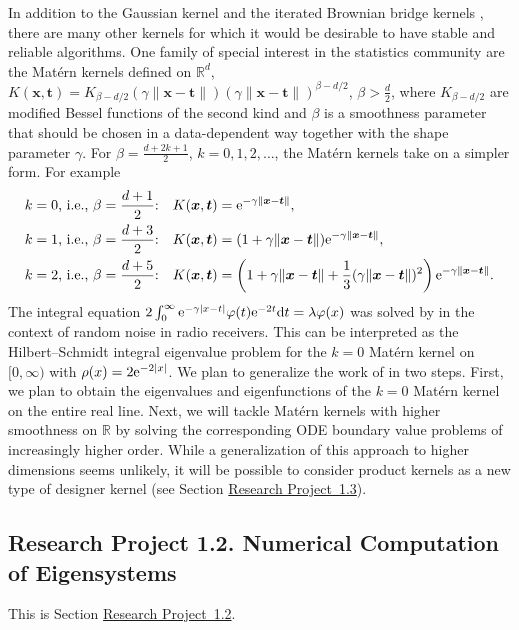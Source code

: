 \documentclass[11pt]{NSFamsart}
\def\reals{{\mathbb{R}}}
\newcommand{\bx}{{\boldsymbol{x}}}
\newcommand{\bt}{{\boldsymbol{t}}}
\newcommand{\me}{\textup{e}}
\def\dif{\textup{d}}
\newcommand{\refprobab}{\hyperref[NumerEigensubsec]{Research Project~1.2}}
\newcommand{\refprobac}{\hyperref[SectDesignerKernels]{Research Project~1.3}}
\begin{document}
In addition to the Gaussian kernel \citep{FMcC12} and the iterated Brownian bridge kernels \citep{CavorettoEtAl14}, there are many other kernels for which it would be desirable to have stable and reliable algorithms. One family of special interest in the statistics community \citep{Ste99} are the Mat\'ern kernels defined on $\reals^d$, $K(\bx,\bt) = K_{\beta-d/2}\left(\gamma\|\bx-\bt\|\right) \left( \gamma \| \bx - \bt \|\right)^{\beta-d/2}$, $\beta > \frac d2$,
where $K_{\beta-d/2}$ are modified Bessel functions of the second kind and $\beta$ is a smoothness parameter that should be chosen in a data-dependent way together with the shape parameter $\gamma$. For $\beta = \frac{d + 2k+1}{2}$, $k=0,1,2,\ldots$, the Mat\'ern kernels take on a simpler form. For example
\begin{align*}
\text{$k = 0$, i.e., $\beta = \frac{d+1}{2}$:}\quad & K(\bx,\bt) = \me^{-\gamma \|\bx-\bt\|}, \\
\text{$k = 1$, i.e., $\beta = \frac{d+3}{2}$:}\quad & K(\bx,\bt) = (1+\gamma \|\bx-\bt\|)\me^{-\gamma \|\bx-\bt\|}, \\
\text{$k = 2$, i.e., $\beta = \frac{d+5}{2}$:}\quad & K(\bx,\bt) = \left(1+\gamma \|\bx-\bt\|+\frac{1}{3}(\gamma \|\bx-\bt\|)^2\right)\me^{-\gamma \|\bx-\bt\|}.
\end{align*}
The integral equation $2\int_0^\infty \me^{-\gamma|x-t|}\varphi(t)\me^{-2t} \dif t = \lambda \varphi(x)$ was solved by \citet{Juncosa45} in the context of random noise in radio receivers. This can be interpreted as the Hilbert--Schmidt integral eigenvalue problem for the $k=0$ Mat\'ern kernel on $[0,\infty)$ with $\rho(x) = 2\me^{-2|x|}$. We plan to generalize the work of \citet{Juncosa45} in two steps. First, we plan to obtain the eigenvalues and eigenfunctions of the $k=0$ Mat\'ern kernel on the entire real line. Next, we will tackle Mat\'ern kernels with higher smoothness on $\reals$ by solving the corresponding ODE boundary value problems of increasingly higher order. While a generalization of this approach to higher dimensions seems unlikely, it will be possible to consider product kernels as a new type of designer kernel (see Section \refprobac).

\subsection*{Research Project 1.2. Numerical Computation of Eigensystems} \label{NumerEigensubsec}

This is Section \refprobab.
\end{document}
